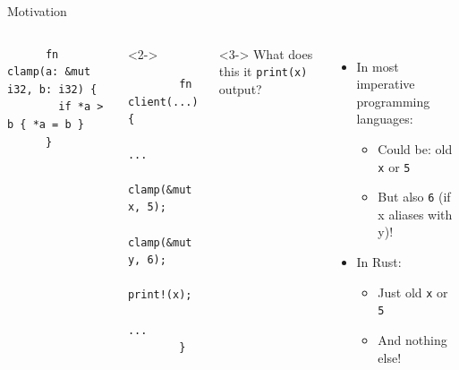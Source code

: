 \documentclass{sdqbeamer}
\newcommand{\code}[1]{\texttt{#1}}
\begin{document}
\begin{frame}[fragile]{Motivation}{}
  \begin{columns}
    \begin{verbatim}
      fn  clamp(a: &mut i32, b: i32) {
        if *a > b { *a = b }
      }
    \end{verbatim}
    \begin{onlyenv}<2->
      \begin{verbatim}
        fn  client(...) {
          ...
          clamp(&mut x, 5);
          clamp(&mut y, 6);
          print!(x);
          ...
        }
      \end{verbatim}
    \end{onlyenv}

    <3->
    What does this it \code{print(x)} output?
    \begin{itemize}
      \item In most imperative programming languages:
      \begin{itemize}
        \item Could be: old \code{x} or \code{5}
        \item<4-> But also \code{6} (if x aliases with y)!
      \end{itemize}
      \item<5-> In Rust:
        \begin{itemize}
          \item Just old \code{x} or \code{5}
          \item And nothing else!
        \end{itemize}
    \end{itemize}
    
  \end{columns}
\end{frame}
\end{document}
